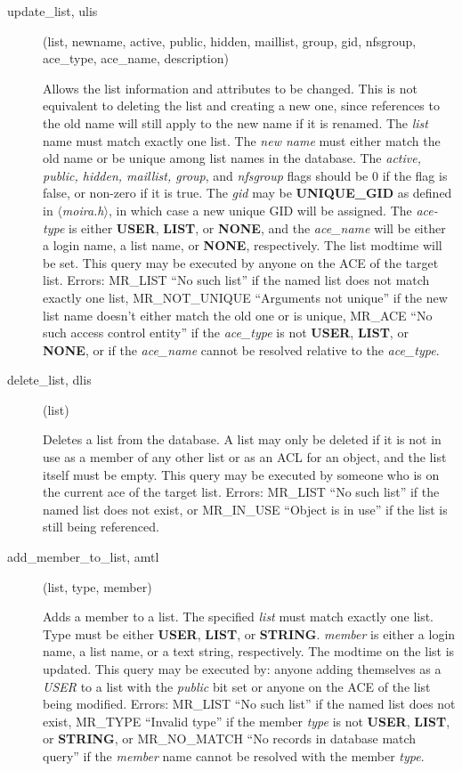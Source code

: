 \documentclass{article}
\begin{document}
\begin{description}
\item[update\_list, ulis](list, newname, active, public, hidden, maillist,
group, gid, nfsgroup, ace\_type, ace\_name, description)

Allows the list information and attributes to be changed. This is not
equivalent to deleting the list and creating a new one, since
references to the old name will still apply to the new name if it is
renamed. The {\em list} name must match exactly one list. The {\em new
name} must either match the old name or be unique among list names in
the database. The {\em active, public, hidden, maillist, group}, and {\em
nfsgroup} flags should be 0 if the flag is false, or non-zero if it is
true. The {\em gid} may be {\bf UNIQUE\_GID} as defined in {\em
$\langle$moira.h$\rangle$}, in which case a new unique GID will be
assigned. The {\em ace-type} is either {\bf USER}, {\bf LIST}, or {\bf
NONE}, and the {\em ace\_name} will be either a login name, a list
name, or {\bf NONE}, respectively. The list modtime will be set. This
query may be executed by anyone on the ACE of the target list. Errors:
MR\_LIST ``No such list'' if the named list does not match exactly one
list, MR\_NOT\_UNIQUE ``Arguments not unique'' if the new list name
doesn't either match the old one or is unique, MR\_ACE ``No such access
control entity'' if the {\em ace\_type} is not {\bf USER}, {\bf LIST},
or {\bf NONE}, or if the {\em ace\_name} cannot be resolved relative to
the {\em ace\_type}.

\item[delete\_list, dlis](list)

Deletes a list from the database.  A list may only be deleted if it is
not in use as a member of any other list or as an ACL for an object,
and the list itself must be empty.  This query may be executed by
someone who is on the current ace of the target list.  Errors:
MR\_LIST ``No such list'' if the named list does not exist, or
MR\_IN\_USE ``Object is in use'' if the list is still being referenced.

\item[add\_member\_to\_list, amtl](list, type, member)

Adds a member to a list.  The specified {\em list} must match exactly
one list.  Type must be either {\bf USER}, {\bf LIST}, or {\bf STRING}.
{\em member} is either a login name, a list name, or a text string,
respectively.  The modtime on the list is updated.  This query may
be executed by: anyone adding themselves as a {\em USER} to a list with the
{\em public} bit set or anyone on the ACE of the list being modified.
Errors: MR\_LIST ``No such list'' if the named list does not exist,
MR\_TYPE ``Invalid type'' if the member {\em type} is not {\bf USER}, {\bf LIST}, or
{\bf STRING}, or MR\_NO\_MATCH ``No records in database match query'' if the
{\em member} name cannot be resolved with the member {\em type}.


\end{description}
\end{document}
